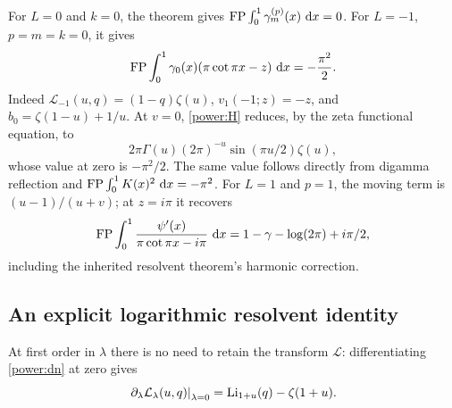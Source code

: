 \begin{example}\label{power:canaries}
For $L=0$ and $k=0$, the theorem gives
$\operatorname{FP}\int_0^1\gamma_m^{(p)}(x)\,\mathop{}\!\mathrm{d} x=0$.
For $L=-1$, $p=m=k=0$, it gives
\begin{equation}\label{power:cotcheck}
 \operatorname{FP}\int_0^1\gamma_0(x)(\pi\cot\pi x-z)\,\mathop{}\!\mathrm{d} x
        =-\frac{\pi^2}{2}.
\end{equation}
Indeed $\mathcal L_{-1}(u,q)=(1-q)\zeta(u)$,
$v_1(-1;z)=-z$, and $b_0=\zeta(1-u)+1/u$.
At $v=0$, \eqref{power:H} reduces, by the zeta functional equation, to
\[
 2\pi\Gamma(u)(2\pi)^{-u}\sin(\pi u/2)\zeta(u),
\]
whose value at zero is $-\pi^2/2$.  The same value follows directly
from digamma reflection and $\operatorname{FP}\int_0^1K(x)^2\,\mathop{}\!\mathrm{d} x=-\pi^2$.
For $L=1$ and $p=1$, the moving term is $(u-1)/(u+v)$; at
$z=i\pi$ it recovers
\[
 \operatorname{FP}\int_0^1\frac{\psi'(x)}{\pi\cot\pi x-i\pi}\,\mathop{}\!\mathrm{d} x
       =1-\gamma-\log(2\pi)+i\pi/2,
\]
including the inherited resolvent theorem's harmonic correction.
\end{example}

\subsection{An explicit logarithmic resolvent identity}

At first order in $\lambda$ there is no need to retain the transform
$\mathcal L$: differentiating \eqref{power:dn} at zero gives
\begin{equation}\label{power:firstlambda}
 \left.\partial_\lambda\mathcal L_\lambda(u,q)\right|_{\lambda=0}
       =\operatorname{Li}_{1+u}(q)-\zeta(1+u).
\end{equation}

